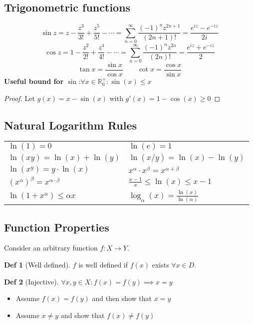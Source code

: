 \documentclass[a4paper, 10pt]{article}
\theoremstyle{definition}
\newtheorem*{definition}{Def}
\newcommand{\R}{\mathbb{R}}
\begin{document}
\subsection*{Trigonometric functions}
\[\sin z = z - \frac{z^3}{3!} + \frac{z^5}{5!} - \cdots = \sum_{n = 0}^\infty \frac{(-1)^n z^{2n + 1}}{(2n + 1)!} = \frac{e^{iz}-e^{-iz}}{2i}\]
\[\cos z = 1 - \frac{z^2}{2!} + \frac{z^4}{4!} - \cdots = \sum_{n = 0}^\infty \frac{(-1)^n z^{2n}}{(2n)!} = \frac{e^{iz}+e^{-iz}}{2}\]
\[\tan x = \frac{\sin x}{\cos x} \qquad \cot x = \frac{\cos x}{\sin x}\]
\textbf{Useful bound for \(\sin\)}:\(\forall x \in \R^+_0: \sin(x) \leq x\)
\begin{proof}
    Let \(g(x) = x - \sin(x)\) with \(g'(x) = 1 - \cos(x) \geq 0\)
\end{proof}

\subsection*{Natural Logarithm Rules}
\begin{tabularx}{\linewidth}{XX}
    $\ln(1) = 0$ & $\ln(e) = 1$ \\
    $\ln(xy) = \ln(x) + \ln(y)$ & $\ln(x/y) = \ln(x) - \ln(y)$ \\
    $\ln(x^y) = y \cdot \ln(x)$ & $x^\alpha \cdot x^\beta = x^{\alpha + \beta}$ \\
    $(x^\alpha)^\beta = x^{\alpha \cdot \beta}$ & $\frac{x - 1}{x} \leq \ln(x) \leq x - 1$ \\
    $\ln(1 + x^\alpha) \leq \alpha x$ & $\log_\alpha(x) = \frac{\ln(x)}{\ln(\alpha)}$
\end{tabularx}

\subsection*{Function Properties}
Consider an arbitrary function $f: X \to Y$.
\begin{definition}[Well defined]
    $f$ is well defined if $f(x)$ exists $\forall x \in D$.
\end{definition}

\begin{definition}[Injective]
    $\forall x, y \in X: f(x) = f(y) \implies x = y$
    \begin{itemize}
        \item Assume $f(x)= f(y)$ and then show that $x = y$
        \item Assume $x \neq y$ and show that $f(x) \neq f(y)$
    \end{itemize}
\end{definition}
\end{document}
